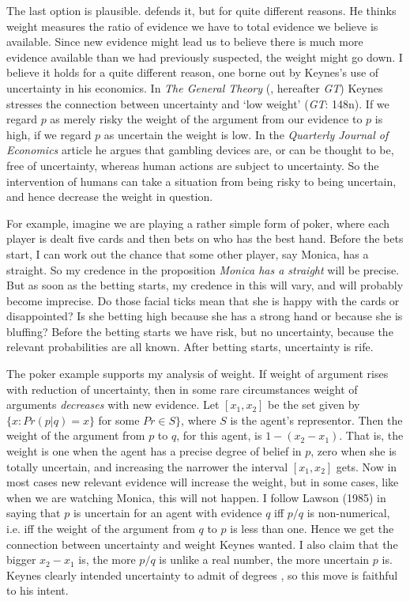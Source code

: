 The last option is plausible. \citet{Runde1990} defends it, but for quite different reasons. He thinks weight measures the ratio of evidence we have to total evidence we believe is available. Since new evidence might lead us to believe there is much more evidence available than we had previously suspected, the weight might go down. I believe it holds for a quite different reason, one borne out by Keynes's use of uncertainty in his economics. In \textit{The General Theory} (\citet{Keynes1936}, hereafter \textit{GT}) Keynes stresses the connection between uncertainty and `low weight' (\textit{GT}: 148n). If we regard \(p\) as merely risky the weight of the argument from our evidence to \(p\) is high, if we regard \(p\) as uncertain the weight is low. In the \textit{Quarterly Journal of Economics }article he argues that gambling devices are, or can be thought to be, free of uncertainty, whereas human actions are subject to uncertainty. So the intervention of humans can take a situation from being risky to being uncertain, and hence decrease the weight in question.

For example, imagine we are playing a rather simple form of poker, where each player is dealt five cards and then bets on who has the best hand. Before the bets start, I can work out the chance that some other player, say Monica, has a straight. So my credence in the proposition \textit{Monica has a straight} will be precise. But as soon as the betting starts, my credence in this will vary, and will probably become imprecise. Do those facial ticks mean that she is happy with the cards or disappointed? Is she betting high because she has a strong hand or because she is bluffing? Before the betting starts we have risk, but no uncertainty, because the relevant probabilities are all known. After betting starts, uncertainty is rife.

The poker example supports my analysis of weight. If weight of argument rises with reduction of uncertainty, then in some rare circumstances weight of arguments \textit{decreases} with new evidence. Let \([x_1, x_2]\) be the set given by \(\{x: Pr(p | q) = x\}\) for some \(Pr \in S\}\), where \(S\) is the agent's representor. Then the weight of the argument from \(p\) to \(q\), for this agent, is \(1-(x_2 - x_1)\). That is, the weight is one when the agent has a precise degree of belief in \(p\), zero when she is totally uncertain, and increasing the narrower the interval \([x_1, x_2]\) gets. Now in most cases new relevant evidence will increase the weight, but in some cases, like when we are watching Monica, this will not happen. I follow Lawson (1985) in saying that \(p\) is uncertain for an agent with evidence \(q\) iff \(p / q\) is non-numerical, i.e. iff the weight of the argument from \(q\) to \(p\) is less than one. Hence we get the connection between uncertainty and weight Keynes wanted. I also claim that the  bigger \(x_2 - x_1\) is, the more \(p / q\) is unlike a real number, the more uncertain \(p\) is. Keynes clearly intended uncertainty to admit of degrees \citet{Keynes1937}, so this move is faithful to his intent.

